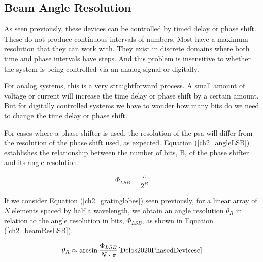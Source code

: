 \subsection{Beam Angle Resolution}
\par As seen previously, these devices can be controlled by timed delay or phase shift. These do not produce continuous intervals of numbers. Most have a maximum resolution that they can work with. They exist in discrete domains where both time and phase intervals have steps. And this problem is insensitive to whether the system is being controlled via an analog signal or digitally.

\par For analog systems, this is a very straightforward process. A small amount of voltage or current will increase the time delay or phase shift by a certain amount. But for digitally controlled systems we have to wonder how many bits do we need to change the time delay or phase shift.

\par For cases where a phase shifter is used, the resolution of the \ac{psa} will differ from the resolution of the phase shift used, as expected. Equation (\ref{ch2_angleLSB}) establishes the relationship between the number of bits, B, of the phase shifter and its angle resolution.

\begin{equation}
    \label{ch2_angleLSB}
    \Phi_{LSB} = \frac{\pi}{2^{B}}
\end{equation}

\par If we consider Equation (\ref{ch2_gratinglobes}) seen previously, for a linear array of \textit{N} elements spaced by half a wavelength, we obtain an angle resolution $\theta_{R}$ in relation to the angle resolution in bits, $\Phi_{LSB}$, as shown in Equation (\ref{ch2_beamResLSB}).

\begin{equation}
    \label{ch2_beamResLSB}
    \theta_{R}\approx\arcsin{\frac{\Phi_{LSB}}{N\cdot\pi}} \text{\cite{Delos2020PhasedDevicesc}}
\end{equation}

